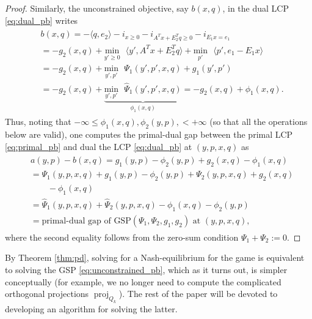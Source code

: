 \documentclass[a4paper,9pt]{extarticle}
\DeclareMathOperator{\proj}{proj}
\begin{document}
\begin{proof}
Similarly, the unconstrained objective, say
$b(x, q)$, in the dual LCP \eqref{eq:dual_pb} writes
\begin{eqnarray*}
  \begin{aligned}
&b(x, q) = 
-\langle q, e_2\rangle -i_{x \ge 0} - i_{A^Tx+E_2^Tq \ge 0} -
 i_{E_1x = e_1}\\
 &= -g_2(x, q) + \underset{y' \geq
   0}{\text{min}}\text{ }\langle y', A^Tx + E_2^Tq\rangle +
 \underset{p'}{\text{min}}\text{ }\langle p', e_1-E_1x\rangle\\
    &= -g_2(x, q)
 +\underset{y',p'}{\text{min}}\text{ }\Psi_1(y', p', x, q) +
 g_1(y', p')\\
& = -g_2(x, q) +
 \underbrace{\underset{y',p'}{\text{min}}\text{ }\hat{\Psi}_1(y', p',
   x, q)}_{\phi_1(x, q)} = -g_2(x, q) + \phi_1(x, q). 
   \end{aligned}
\end{eqnarray*}
Thus, noting that $-\infty \le \phi_1(x, q), \phi_2(y, p), < +\infty$
(so that all the operations below are valid),
one computes the primal-dual gap between the primal LCP
\eqref{eq:primal_pb} and dual the LCP \eqref{eq:dual_pb} at $(y, p, x, q)$ as
\begin{eqnarray*}
  \begin{split}
    &a(y, p) - b(x, q) = g_1(y, p) - \phi_2(y, p) + g_2(x, q) - \phi_1(x,
  q) \\
  &= \Psi_1(y, p, x, q) +  g_1(y, p) - \phi_2(y, p) + \Psi_2(y, p, x,
  q) + g_2(x, q) \\
  &\hspace{2em}- \phi_1(x, q)\\
  &= \hat{\Psi}_1(y, p, x, q) + \hat{\Psi}_2(y, p, x, q) - \phi_1(x,
  q) - \phi_2(y, p)\\
  &= \text{primal-dual gap of GSP}(\Psi_1, \Psi_2,
  g_1, g_2) \text{ at }(y, p, x, q),
  \end{split}
\end{eqnarray*}
where the second equality follows from the zero-sum condition $\Psi_1
+ \Psi_2 := 0$.
\end{proof}


By Theorem \ref{thm:pd}, solving for a Nash-equilibrium for
the game is equivalent to solving the GSP
\eqref{eq:unconstrained_pb}, which as it turns out, is simpler
conceptually (for example, we no longer need to compute the
complicated orthogonal projections $\proj_{Q_k}$). The rest of the
paper will be devoted to developing an algorithm for solving the latter.


\end{document}
